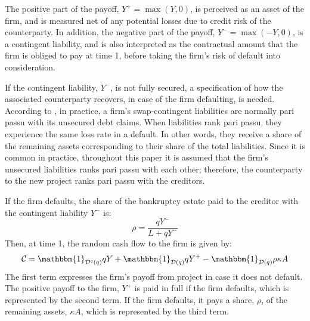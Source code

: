 \documentclass[main.tex]{subfiles}
\begin{document}
        The positive part of the payoff, $Y^{+}=\max\left(Y,0\right)$, is perceived as an asset of the firm, and is measured net of any potential losses due to credit risk of the counterparty.
        In addition, the negative part of the payoff, $Y^{-} = \max \left(-Y,0\right)$, is a contingent liability, and is also interpreted as the contractual amount that the firm is obliged to pay at time 1, before taking the firm's risk of default into consideration.

        If the contingent liability, $Y^{-}$, is not fully secured, a specification of how the associated counterparty recovers, in case of the firm defaulting, is needed.
        According to \textcite{ADS2019}, in practice, a firm's swap-contingent liabilities 
        are normally pari passu with its unsecured debt claims.
        When liabilities rank pari passu, they experience the same loss rate in a default.
        In other words, they receive a share of the remaining assets 
        corresponding to their share of the total liabilities.
        Since it is common in practice, throughout this paper it is assumed that the firm's 
        unsecured liabilities ranks pari passu with each other;
        therefore, the counterparty to the new project ranks pari passu with the creditors.

        If the firm defaults, the share of the bankruptcy estate paid to the creditor with 
        the contingent liability $Y^{-}$ is:
            \begin{equation*}
                \rho = 
                \frac{
                    qY^{-}
                }{
                    L + qY^{-}
                } 
            \end{equation*}
        Then, at time 1, the random cash flow to the firm is given by:
        \begin{equation}
            \mathcal{C} 
            = 
            \mathbbm{1}_{\mathcal{D}^{c}(q)} qY
            + \mathbbm{1}_{\mathcal{D}(q)} qY^{+}
            - \mathbbm{1}_{\mathcal{D}(q)} \rho \kappa A
        \end{equation}
        The first term expresses the firm's payoff from project in case it does not default. 
        The positive payoff to the firm, $Y^{+}$ is paid in full if the firm defaults,
        which is represented by the second term.
        If the firm defaults, it pays a share, $\rho$, of the remaining assets, $\kappa A$,
        which is represented by the third term.
\end{document}
